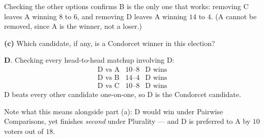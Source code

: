\documentclass[12pt]{ximera}
\begin{document}
\begin{problem}
\begin{prompt}
\begin{feedback}
Checking the other options confirms B is the only one that works: removing C leaves A
winning $8$ to $6$, and removing D leaves A winning $14$ to $4$. (A cannot be removed,
since A is the winner, not a loser.)
\end{feedback}
\end{prompt}

\begin{prompt}
\textbf{(c)} Which candidate, if any, is a Condorcet winner in this election?

\begin{multipleChoice}
\end{multipleChoice}

\begin{feedback}
\textbf{D}. Checking every head-to-head matchup involving D:
\[
\begin{array}{lll}
\text{D vs A} & 10\text{--}8 & \text{D wins}\\
\text{D vs B} & 14\text{--}4 & \text{D wins}\\
\text{D vs C} & 10\text{--}8 & \text{D wins}
\end{array}
\]
D beats every other candidate one-on-one, so D is the Condorcet candidate.

Note what this means alongside part (a): D would win under Pairwise Comparisons, yet
finishes \emph{second} under Plurality --- and D is preferred to A by $10$ voters out
of $18$.
\end{feedback}
\end{prompt}
\end{problem}
\end{document}
